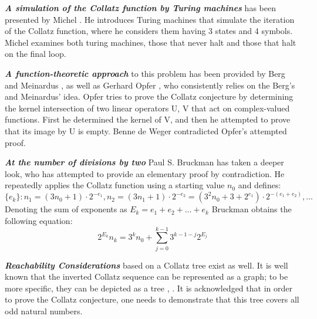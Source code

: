 \par\medskip
\textit{\textbf{A simulation of the Collatz function by Turing machines}} has been presented by Michel \cite{Ref_Michel_2014}. He introduces Turing machines that simulate the iteration of the Collatz function, where he considers them having 3 states and 4 symbols. Michel examines both turing machines, those that never halt and those that halt on the final loop.

\par\medskip
\textit{\textbf{A function-theoretic approach}} to this problem has been provided by Berg and Meinardus \cite{Ref_Berg_Meinardus_1994}, \cite{Ref_Berg_Meinardus_1995} as well as Gerhard Opfer \cite{Ref_Opfer_2011}, who consistently relies on the Berg’s and Meinardus’ idea. Opfer tries to prove the Collatz conjecture by determining the kernel intersection of two linear operators U, V that act on complex-valued functions. First he determined the kernel of V, and then he attempted to prove that its image by U is empty. Benne de Weger \cite{Ref_de_Weger_2011} contradicted Opfer’s attempted proof.

\par\medskip
\textit{\textbf{At the number of divisions by two}} Paul S. Bruckman \cite{Ref_Bruckman_2008} has taken a deeper look, who has attempted to provide an elementary proof by contradiction. He repeatedly applies the Collatz function using a starting value $n_0$ and defines:
\[
\{e_k\}:n_1=(3n_0+1)\cdot2^{-e_1},n_2=(3n_1+1)\cdot2^{-e_2}=(3^2n_0+3+2^{e_1})\cdot2^{-(e_1+e_2)},\ldots
\]
Denoting the sum of exponents as $E_k=e_1+e_2+\ldots+e_k$ Bruckman obtains the following equation:
\[
2^{E_k}n_k=3^kn_0+\sum_{j=0}^{k-1}3^{k-1-j}2^{E_j}
\]

\par\medskip
\textit{\textbf{Reachability Considerations}} based on a Collatz tree exist as well. It is well known that the inverted Collatz sequence can be represented as a graph; to be more specific, they can be depicted as a tree \cite{Ref_Andrei_Masalagiu}, \cite{Ref_Kak_2014}. It is acknowledged that in order to prove the Collatz conjecture, one needs to demonstrate that this tree covers all odd natural numbers.

